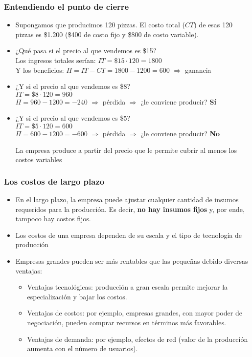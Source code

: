 \documentclass{beamer}
\begin{document}
\begin{frame}
    \frametitle{Entendiendo el punto de cierre}
    \begin{itemize}
        \item Supongamos que producimos 120 pizzas. El costo total ($CT$) de esas 120 pizzas es \$1.200 (\$400 de costo fijo y \$800 de costo variable). 
        \item ¿Qué pasa si el precio al que vendemos es \$15? \\ \pause
        Los ingresos totales serían: $IT=\$15 \cdot 120 = 1800$
        \\ 
        Y los beneficios: $\Pi= IT -CT=1800-1200=600 $ $\Rightarrow$ ganancia \pause
        \item ¿Y si el precio al que vendemos es \$8? \\ \pause
        $IT = \$8 \cdot 120 = 960$
        \\ 
        $\Pi = 960-1200=-240 $ $\Rightarrow$ pérdida $\Rightarrow$ ¿le conviene producir? \pause \textbf{Sí} \pause
        \item ¿Y si el precio al que vendemos es \$5? \\ \pause
        $IT = \$5 \cdot 120 = 600$
        \\ 
        $\Pi = 600-1200=-600 $ $\Rightarrow$ pérdida $\Rightarrow$ ¿le conviene producir? \pause \textbf{No} \pause
            \begin{boxB}
            \centering
            La empresa produce a partir del precio que le permite cubrir al menos los costos variables
        \end{boxB}
    \end{itemize}
\end{frame}


\begin{frame}
\frametitle{Los costos de largo plazo}
\begin{itemize}
  \item En el largo plazo, la empresa puede ajustar cualquier cantidad de insumos requeridos para la producción. Es decir, \textbf{no hay insumos fijos} y, por ende, tampoco hay costos fijos. 
    \item Los costos de una empresa dependen de su escala y el tipo de tecnología de producción
    \item Empresas grandes pueden ser más rentables que las pequeñas debido diversas ventajas:
    \begin{itemize}
        \item Ventajas tecnológicas: producción a gran escala permite mejorar la especialización y bajar los costos. \vspace{1mm}
        \item Ventajas de costos: por ejemplo, empresas grandes, con mayor poder de negociación, pueden comprar recursos en términos más favorables.  \vspace{1mm}
        \item Ventajas de demanda: por ejemplo, efectos de red (valor de la producción aumenta con el número de usuarios).  \vspace{1mm}
    \end{itemize}
\end{itemize}
\end{frame}
\end{document}
